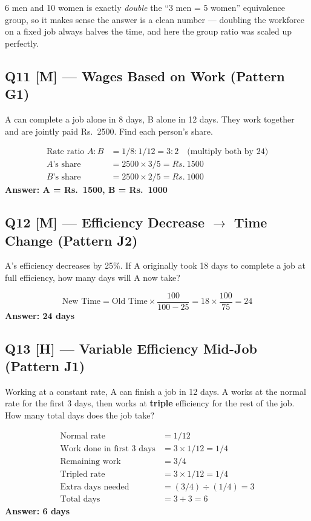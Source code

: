 \documentclass[11pt]{article}
\begin{document}
\begin{tipbox}[Note]
6 men and 10 women is exactly \emph{double} the ``3 men = 5 women'' equivalence group, so it makes
sense the answer is a clean number --- doubling the workforce on a fixed job always halves the time,
and here the group ratio was scaled up perfectly.
\end{tipbox}

\subsection*{Q11 [M] --- Wages Based on Work (Pattern G1)}
A can complete a job alone in 8 days, B alone in 12 days. They work together and are jointly paid
Rs.~2500. Find each person's share.

\begin{tipbox}[Solution]
\begin{align*}
\text{Rate ratio } A:B &= 1/8 : 1/12 = 3:2 \quad \text{(multiply both by 24)} \\
A\text{'s share} &= 2500 \times 3/5 = Rs.~1500 \\
B\text{'s share} &= 2500 \times 2/5 = Rs.~1000
\end{align*}
\textbf{Answer: A = Rs.~1500, B = Rs.~1000}
\end{tipbox}

\subsection*{Q12 [M] --- Efficiency Decrease $\to$ Time Change (Pattern J2)}
A's efficiency decreases by 25\%. If A originally took 18 days to complete a job at full efficiency,
how many days will A now take?

\begin{tipbox}[Solution]
\[
\text{New Time} = \text{Old Time} \times \frac{100}{100-25} = 18 \times \frac{100}{75} = 24
\]
\textbf{Answer: 24 days}
\end{tipbox}

\subsection*{Q13 [H] --- Variable Efficiency Mid-Job (Pattern J1)}
Working at a constant rate, A can finish a job in 12 days. A works at the normal rate for the first 3
days, then works at \textbf{triple} efficiency for the rest of the job. How many total days does the
job take?

\begin{tipbox}[Solution]
\begin{align*}
\text{Normal rate} &= 1/12 \\
\text{Work done in first 3 days} &= 3 \times 1/12 = 1/4 \\
\text{Remaining work} &= 3/4 \\
\text{Tripled rate} &= 3 \times 1/12 = 1/4 \\
\text{Extra days needed} &= (3/4) \div (1/4) = 3 \\
\text{Total days} &= 3 + 3 = 6
\end{align*}
\textbf{Answer: 6 days}
\end{tipbox}
\end{document}
